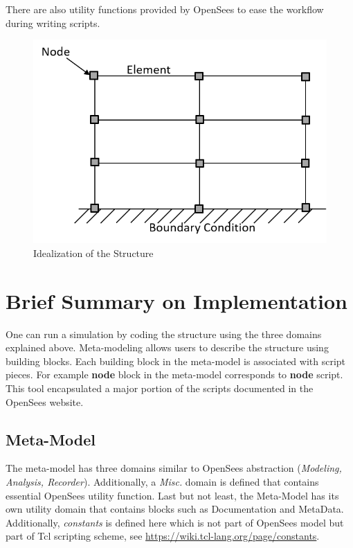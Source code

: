 \documentclass[letterpaper]{article}
\begin{document}
	There are also utility functions provided by OpenSees to ease the workflow during writing scripts.

	\begin{figure}[htbp]
		\includegraphics[scale=0.60]{model.png}
		\centering
		\caption{Idealization of the Structure}
		\label{fig:os_model}%
	\end{figure}
	
	\section*{Brief Summary on Implementation}
	One can run a simulation by coding the structure using the three domains explained above. Meta-modeling allows users to describe the structure using building blocks. Each building block in the meta-model is associated with script pieces. For example \textbf{node} block in the meta-model corresponds to \textbf{node} script. This tool encapsulated a major portion of the scripts documented in the OpenSees website.
	
	\subsection*{Meta-Model}
	The meta-model has three domains similar to OpenSees abstraction (\textit{Modeling, Analysis, Recorder}). Additionally, a \textit{Misc.} domain is defined that contains essential OpenSees utility function. Last but not least, the Meta-Model has its own utility domain that contains blocks such as Documentation and MetaData. Additionally, \textit{constants} is defined here which is not part of OpenSees model but part of Tcl scripting scheme, see \url{https://wiki.tcl-lang.org/page/constants}.
	
\end{document}
